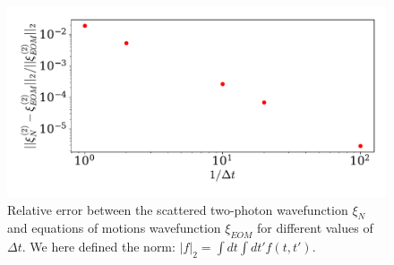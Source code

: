\documentclass[10pt,oneside,a4paper,english]{report}
\begin{document}
\begin{appendices}
\begin{figure}[H]
    \centering
    \includegraphics[width=0.5 \linewidth]{figures/twophoton_convergence.pdf}
    \caption{Relative error between the scattered two-photon wavefunction $\xi_N$ and equations of motions wavefunction $\xi_{EOM}$ for different values of $\Delta t$. We here defined the norm: $|f|_2 = \int dt \int dt' f(t,t')$.}
    \label{fig:twophoton_convergence}
\end{figure}




\end{appendices}



\label{endOfDoc}
\end{document}
